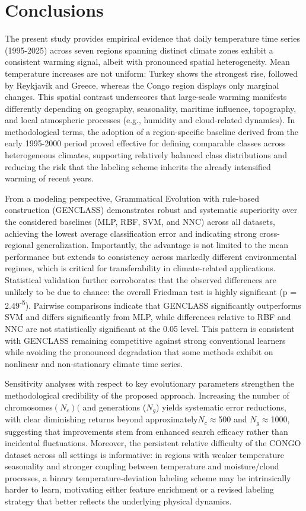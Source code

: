 \documentclass[12pt]{Definitions/academia}
\begin{document}
\section{Conclusions\label{sec:Conclusions}}
The present study provides empirical evidence that daily temperature
time series (1995-2025) across seven regions spanning distinct climate
zones exhibit a consistent warming signal, albeit with pronounced
spatial heterogeneity. Mean temperature increases are not uniform:
Turkey shows the strongest rise, followed by Reykjavik and Greece,
whereas the Congo region displays only marginal changes. This spatial
contrast underscores that large-scale warming manifests differently
depending on geography, seasonality, maritime influence, topography,
and local atmospheric processes (e.g., humidity and cloud-related
dynamics). In methodological terms, the adoption of a region-specific
baseline derived from the early 1995-2000 period proved effective
for defining comparable classes across heterogeneous climates, supporting
relatively balanced class distributions and reducing the risk that
the labeling scheme inherits the already intensified warming of recent
years.

From a modeling perspective, Grammatical Evolution with rule-based
construction (GENCLASS) demonstrates robust and systematic superiority
over the considered baselines (MLP, RBF, SVM, and NNC) across all
datasets, achieving the lowest average classification error and indicating
strong cross-regional generalization. Importantly, the advantage is
not limited to the mean performance but extends to consistency across
markedly different environmental regimes, which is critical for transferability
in climate-related applications. Statistical validation further corroborates
that the observed differences are unlikely to be due to chance: the
overall Friedman test is highly significant (p = 2.49\textsuperscript{-}\textsuperscript{5}).
Pairwise comparisons indicate that GENCLASS significantly outperforms
SVM and differs significantly from MLP, while differences relative
to RBF and NNC are not statistically significant at the 0.05 level.
This pattern is consistent with GENCLASS remaining competitive against
strong conventional learners while avoiding the pronounced degradation
that some methods exhibit on nonlinear and non-stationary climate
time series.

Sensitivity analyses with respect to key evolutionary parameters strengthen
the methodological credibility of the proposed approach. Increasing
the number of chromosomes$(N_{c})($ and generations ($N_{g}$) yields
systematic error reductions, with clear diminishing returns beyond
approximately$N_{c}$\ensuremath{\approx}500 and $N_{g}$\ensuremath{\approx}1000,
suggesting that improvements stem from enhanced search efficacy rather
than incidental fluctuations. Moreover, the persistent relative difficulty
of the CONGO dataset across all settings is informative: in regions
with weaker temperature seasonality and stronger coupling between
temperature and moisture/cloud processes, a binary temperature-deviation
labeling scheme may be intrinsically harder to learn, motivating either
feature enrichment or a revised labeling strategy that better reflects
the underlying physical dynamics.
\end{document}
